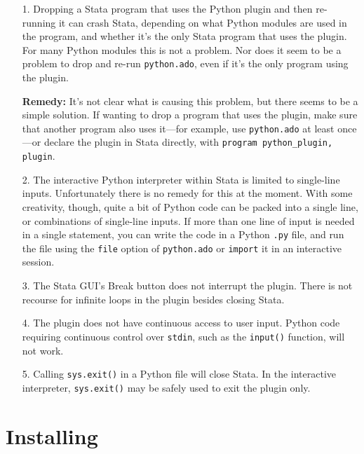 \documentclass{article}
\begin{document}
	\begin{enumerate}
		\item[1.] Dropping a Stata program that uses the Python plugin and then re-running it can crash Stata, depending on what Python modules are used in the program, and whether it's the only Stata program that uses the plugin. For many Python modules this is not a problem. Nor does it seem to be a problem to drop and re-run \lstinline{python.ado}, even if it's the only program using the plugin.
			
		\textbf{Remedy:} It's not clear what is causing this problem, but there seems to be a simple solution. If wanting to drop a program that uses the plugin, make sure that another program also uses it---for example, use \lstinline{python.ado} at least once---or declare the plugin in Stata directly, with \lstinline{program python_plugin, plugin}.
			
		\item[2.] The interactive Python interpreter within Stata is limited to single-line inputs. Unfortunately there is no remedy for this at the moment. With some creativity, though, quite a bit of Python code can be packed into a single line, or combinations of single-line inputs. If more than one line of input is needed in a single statement, you can write the code in a Python \lstinline{.py} file, and run the file using the \lstinline{file} option of \lstinline{python.ado} or \lstinline{import} it in an interactive session.
			
		\item[3.] The Stata \textsc{GUI}'s Break button does not interrupt the plugin. There is not recourse for infinite loops in the plugin besides closing Stata.
			
		\item[4.] The plugin does not have continuous access to user input. Python code requiring continuous control over \lstinline{stdin}, such as the \lstinline{input()} function, will not work.
			
		\item[5.] Calling \lstinline{sys.exit()} in a Python file will close Stata. In the interactive interpreter, \lstinline{sys.exit()} may be safely used to exit the plugin only.
	\end{enumerate}



\section{Installing} \label{installing}
				
\end{document}
